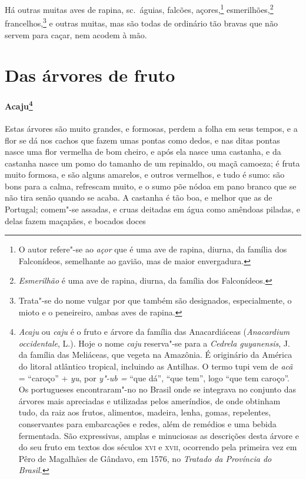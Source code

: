  Há outras muitas aves de rapina, sc.~águias, falcões, 
açores,\footnote{ O autor refere"-se ao \textit{açor} que é uma ave de rapina,
diurna, da família dos Falconídeos, semelhante ao gavião, mas de maior
envergadura.} esmerilhões,\footnote{ \textit{Esmerilhão} é uma ave
de rapina, diurna, da família dos Falconídeos.} 
francelhos,\footnote{ Trata"-se do nome vulgar por que também são designados, especialmente, o
mioto e o peneireiro, ambas aves de rapina.} e outras muitas, mas são
todas de ordinário tão bravas que não servem para caçar, nem acodem à mão.

\section{Das árvores de fruto}
\paragraph{Acaju\footnote{ \textit{Acaju} ou \textit{caju} é
o fruto e árvore da família das Anacardiáceas (\textit{Anacardium
occidentale}, L.). Hoje o nome \textit{caju} reserva"-se para a
\textit{Cedrela guyanensis}, J. da família das Meliáceas, que vegeta
na Amazônia. É originário da América do litoral atlântico tropical,
incluindo as Antilhas. O termo tupi vem de \textit{acã} = ``caroço'' +
\textit{yu}, por \textit{y"-ub =} ``que dá'', ``que tem'', logo ``que tem
caroço''. Os portugueses encontraram"-no no Brasil onde se integrava no
conjunto das árvores mais apreciadas e utilizadas pelos ameríndios, de
onde obtinham tudo, da raiz aos frutos, alimentos, madeira, lenha,
gomas, repelentes, conservantes para embarcações e redes, além de
remédios e uma bebida fermentada. São expressivas, amplas e minuciosas
as descrições desta árvore e do seu fruto em textos dos séculos \textsc{xvi} e
\textsc{xvii}, ocorrendo pela primeira vez em Pêro de Magalhães de Gândavo, em 1576,
no \textit{Tratado da Província do Brasil.}}} Estas árvores
são muito grandes, e formosas, perdem a folha em seus tempos, e a flor
se dá nos cachos que fazem umas pontas como dedos, e nas ditas pontas
nasce uma flor vermelha de bom cheiro, e após ela nasce uma castanha, e
da castanha nasce um pomo do tamanho de um repinaldo, ou maçã camoeza;
é fruta muito formosa, e são alguns amarelos, e outros vermelhos, e
tudo é sumo: são bons para a calma, refrescam muito, e o sumo põe nódoa
em pano branco que se não tira senão quando se acaba. A castanha é tão
boa, e melhor que as de Portugal; comem"-se assadas, e cruas deitadas em
água como amêndoas piladas, e delas fazem maçapães, e bocados doces
